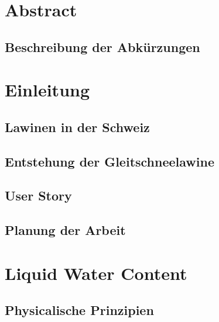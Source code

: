 \documentclass[a4paper,12pt]{article}
\begin{document}
\begin{titlepage}
  \end{titlepage}



\pagestyle{empty}
\section*{Abstract}


\newpage
\subsection*{Beschreibung der Abkürzungen}

\newpage
\tableofcontents
\newpage
\pagestyle{fancy}

\setcounter{page}{1}
\section{Einleitung}


\subsection{Lawinen in der Schweiz}


\subsection{Entstehung der Gleitschneelawine}



\subsection{User Story}


\subsection{Planung der Arbeit}


\section{Liquid Water Content}


\subsection{Physicalische Prinzipien}

\end{document}
